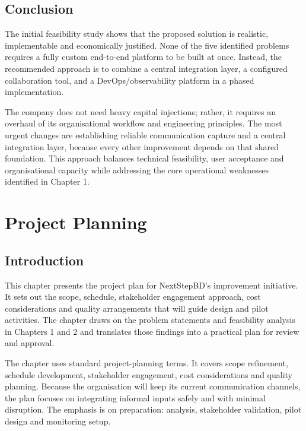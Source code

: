 \documentclass[12pt,a4paper]{report}
\begin{document}
\section{Conclusion}
The initial feasibility study shows that the proposed solution is realistic, implementable and economically justified. None of the five identified problems requires a fully custom end-to-end platform to be built at once. Instead, the recommended approach is to combine a central integration layer, a configured collaboration tool, and a DevOps/observability platform in a phased implementation.

The company does not need heavy capital injections; rather, it requires an overhaul of its organisational workflow and engineering principles. The most urgent changes are establishing reliable communication capture and a central integration layer, because every other improvement depends on that shared foundation. This approach balances technical feasibility, user acceptance and organisational capacity while addressing the core operational weaknesses identified in Chapter 1.



\chapter{Project Planning}

\section{Introduction}
This chapter presents the project plan for NextStepBD's improvement initiative. It sets out the scope, schedule, stakeholder engagement approach, cost considerations and quality arrangements that will guide design and pilot activities. The chapter draws on the problem statements and feasibility analysis in Chapters 1 and 2 and translates those findings into a practical plan for review and approval.

The chapter uses standard project-planning terms. It covers scope refinement, schedule development, stakeholder engagement, cost considerations and quality planning. Because the organisation will keep its current communication channels, the plan focuses on integrating informal inputs safely and with minimal disruption. The emphasis is on preparation: analysis, stakeholder validation, pilot design and monitoring setup.
\end{document}
